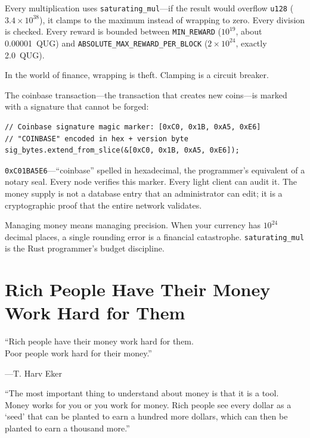 \documentclass[11pt,a4paper]{article}
\begin{document}
Every multiplication uses \texttt{saturating\_mul}---if the result would
overflow \texttt{u128} ($3.4 \times 10^{38}$), it clamps to the maximum
instead of wrapping to zero. Every division is checked. Every reward is
bounded between \texttt{MIN\_REWARD} ($10^{19}$, about 0.00001~QUG) and
\texttt{ABSOLUTE\_MAX\_REWARD\_PER\_BLOCK} ($2 \times 10^{24}$, exactly
2.0~QUG).

In the world of finance, wrapping is theft. Clamping is a circuit
breaker.

The coinbase transaction---the transaction that creates new coins---is
marked with a signature that cannot be forged:

\begin{lstlisting}[caption={The Coinbase Marker (\texttt{q-types/src/lib.rs})}]
// Coinbase signature magic marker: [0xC0, 0x1B, 0xA5, 0xE6]
// "COINBASE" encoded in hex + version byte
sig_bytes.extend_from_slice(&[0xC0, 0x1B, 0xA5, 0xE6]);
\end{lstlisting}

\texttt{0xC01BA5E6}---``coinbase'' spelled in hexadecimal, the
programmer's equivalent of a notary seal. Every node verifies this
marker. Every light client can audit it. The money supply is not
a database entry that an administrator can edit; it is a cryptographic
proof that the entire network validates.

\begin{principle}[title={\textbf{The Principle}}]
Managing money means managing precision. When your currency has $10^{24}$
decimal places, a single rounding error is a financial catastrophe.
\texttt{saturating\_mul} is the Rust programmer's budget discipline.
\end{principle}


\section{Rich People Have Their Money Work Hard for Them}

\epigraph{``Rich people have their money work hard for them.\\
Poor people work hard for their money.''}%
{---T. Harv Eker}

\begin{wealthbox}[title={\raisebox{-0.5pt}{\tiny$\bigstar$} Wealth File \#6}]
``The most important thing to understand about money is that it is a
tool. Money works for you or you work for money. Rich people see every
dollar as a `seed' that can be planted to earn a hundred more dollars,
which can then be planted to earn a thousand more.''
\end{wealthbox}
\end{document}
